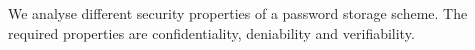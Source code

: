 We analyse different security properties of a password storage scheme.
The required properties are confidentiality, deniability and verifiability.
